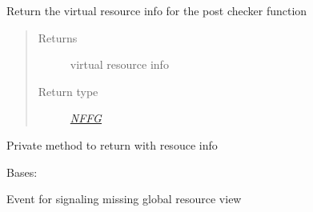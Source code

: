 \documentclass[letterpaper,10pt,english]{sphinxmanual}
\begin{document}
\begin{fulllineitems}
\begin{fulllineitems}
Return the virtual resource info for the post checker function
\begin{quote}\begin{description}
\item[{Returns}] \leavevmode
virtual resource info

\item[{Return type}] \leavevmode
{\hyperref[util/nffg:escape.util.nffg.NFFG]{\emph{NFFG}}}

\end{description}\end{quote}

\end{fulllineitems}


\begin{fulllineitems}
\label{orchest/virtualization_mgmt:escape.orchest.virtualization_mgmt.ESCAPEVirtualizer._generate_resource_info}
Private method to return with resouce info

\end{fulllineitems}


\end{fulllineitems}


\begin{fulllineitems}
\label{orchest/virtualization_mgmt:escape.orchest.virtualization_mgmt.MissingGlobalViewEvent}
Bases: 

Event for signaling missing global resource view

\end{fulllineitems}

\end{document}
